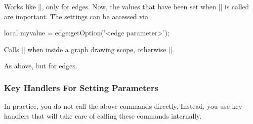 \begin{command}{\pgfgdedgeparameter{}} 
  Works like |\pgfgdnodeparameter|, only for edges. Now, the values
  that have been set when |\pgfgdedge| is called are important. The
  settings can be accessed via 
\begin{codeexample}
  local myvalue = edge:getOption('<edge parameter>');
\end{codeexample}
\end{command}

\begin{command}{\pgfgdhybridnodegraphparameter{}}
  Calls |\pgfgdnodeparameter| when inside a graph drawing scope,
  otherwise |\pgfgdgraphparameter|.  
\end{command}

\begin{command}{\pgfgdhybridedgegraphparameter{}}
  As above, but for edges.
\end{command}

\subsubsection{Key Handlers  For Setting Parameters}

In practice, you do not call the above commands directly. Instead, you
use key handlers that will take care of calling these commands
internally.

